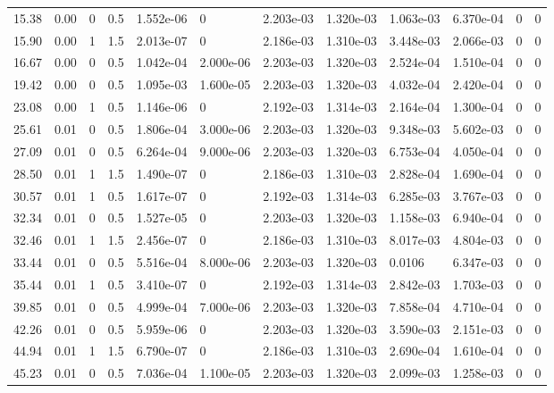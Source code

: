 \documentclass[preview]{standalone}
\begin{document}
{{\begin{tabular}{L{1.2cm}C{1.2cm} C{0.3cm}C{0.5cm} C{1.4cm}C{1.4cm} C{1.4cm}C{1.4cm} C{1.6cm}C{1.6cm} C{1.6cm}C{1.6cm}}
  15.38  &  0.00  & 0     & 0.5 &  1.552e-06  & 0  &  2.203e-03&   1.320e-03& 1.063e-03 & 6.370e-04   &  0 & 0  \\ 
  15.90  &  0.00  & 1     & 1.5 &  2.013e-07  & 0  &  2.186e-03&   1.310e-03& 3.448e-03 & 2.066e-03   &  0 & 0  \\ 
  16.67  &  0.00  & 0     & 0.5 &  1.042e-04  & 2.000e-06  &  2.203e-03&   1.320e-03& 2.524e-04 & 1.510e-04   &  0 & 0  \\ 
  19.42  &  0.00  & 0     & 0.5 &  1.095e-03  & 1.600e-05  &  2.203e-03&   1.320e-03& 4.032e-04 & 2.420e-04   &  0 & 0  \\ 
  23.08  &  0.00  & 1     & 0.5 &  1.146e-06  & 0  &  2.192e-03&   1.314e-03& 2.164e-04 & 1.300e-04   &  0 & 0  \\ 
  25.61  &  0.01  & 0     & 0.5 &  1.806e-04  & 3.000e-06  &  2.203e-03&   1.320e-03& 9.348e-03 & 5.602e-03   &  0 & 0  \\ 
  27.09  &  0.01  & 0     & 0.5 &  6.264e-04  & 9.000e-06  &  2.203e-03&   1.320e-03& 6.753e-04 & 4.050e-04   &  0 & 0  \\ 
  28.50  &  0.01  & 1     & 1.5 &  1.490e-07  & 0  &  2.186e-03&   1.310e-03& 2.828e-04 & 1.690e-04   &  0 & 0  \\ 
  30.57  &  0.01  & 1     & 0.5 &  1.617e-07  & 0  &  2.192e-03&   1.314e-03& 6.285e-03 & 3.767e-03   &  0 & 0  \\ 
  32.34  &  0.01  & 0     & 0.5 &  1.527e-05  & 0  &  2.203e-03&   1.320e-03& 1.158e-03 & 6.940e-04   &  0 & 0  \\ 
  32.46  &  0.01  & 1     & 1.5 &  2.456e-07  & 0  &  2.186e-03&   1.310e-03& 8.017e-03 & 4.804e-03   &  0 & 0  \\ 
  33.44  &  0.01  & 0     & 0.5 &  5.516e-04  & 8.000e-06  &  2.203e-03&   1.320e-03& 0.0106 & 6.347e-03   &  0 & 0  \\ 
  35.44  &  0.01  & 1     & 0.5 &  3.410e-07  & 0  &  2.192e-03&   1.314e-03& 2.842e-03 & 1.703e-03   &  0 & 0  \\ 
  39.85  &  0.01  & 0     & 0.5 &  4.999e-04  & 7.000e-06  &  2.203e-03&   1.320e-03& 7.858e-04 & 4.710e-04   &  0 & 0  \\ 
  42.26  &  0.01  & 0     & 0.5 &  5.959e-06  & 0  &  2.203e-03&   1.320e-03& 3.590e-03 & 2.151e-03   &  0 & 0  \\ 
  44.94  &  0.01  & 1     & 1.5 &  6.790e-07  & 0  &  2.186e-03&   1.310e-03& 2.690e-04 & 1.610e-04   &  0 & 0  \\ 
  45.23  &  0.01  & 0     & 0.5 &  7.036e-04  & 1.100e-05  &  2.203e-03&   1.320e-03& 2.099e-03 & 1.258e-03   &  0 & 0  \\ 

\end{tabular}}}
\end{document}
